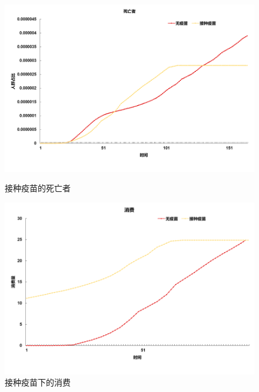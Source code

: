 \begin{figure}[htbp]
    \begin{minipage}{0.49\linewidth}
		\centering
		\includegraphics[width=0.9\linewidth]{fig/image051.png}
		\caption{接种疫苗的死亡者}
		\label{fig:ima27}%
	\end{minipage}
	\begin{minipage}{0.49\linewidth}
		\centering
		\includegraphics[width=0.9\linewidth]{fig/image053.png}
		\caption{接种疫苗下的消费}
		\label{fig:ima28}%
	\end{minipage}
\end{figure}
\vspace{100em}